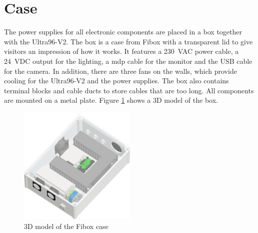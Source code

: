 \section{Case}
\label{sec:hardware:case}

The power supplies for all electronic components are placed in a box together with the Ultra96-V2.
The box is a case from Fibox with a transparent lid to give visitors an impression of how it works.
It features a \SI{230}{VAC} power cable, a \SI{24}{VDC} output for the lighting, a \acrlong{mdp} cable for the monitor and the USB cable for the camera.
In addition, there are three fans on the walls, which provide cooling for the Ultra96-V2 and the power supplies.
The box also contains terminal blocks and cable ducts to store cables that are too long.
All components are mounted on a metal plate.
Figure \ref{fig:fibox3d} shows a 3D model of the box.

\begin{figure}[h]
  \centering
  \includegraphics[width=0.5\textwidth]{graphics/case.png}
  \caption{3D model of the Fibox case}
  \label{fig:fibox3d}
\end{figure}
